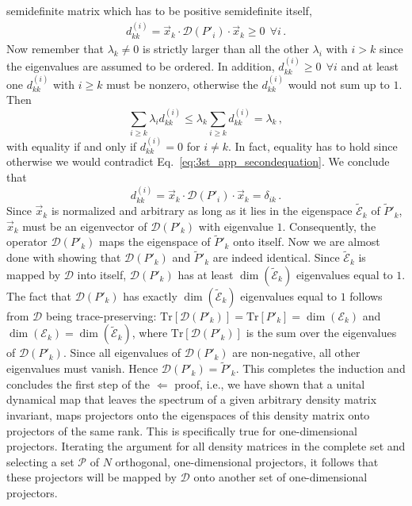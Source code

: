 semidefinite matrix which has to be positive semidefinite
itself,
\begin{eqnarray*}
d_{kk}^{\left(i\right)}=\vec{x}_{k}\cdot\mathcal{D}\left(P'_{i}\right)
\cdot\vec{x}_{k} \geq  0\ ~\forall i \,.
\end{eqnarray*}
Now remember that $\lambda_{k}\neq0$ is strictly larger than
all the other $\lambda_{i}$ with $i>k$  since the eigenvalues are assumed
to be ordered. In addition, $d_{kk}^{\left(i\right)}\geq0\ ~\forall i$
and at least one $d_{kk}^{\left(i\right)}$ with $i\ge k$ must be nonzero,
otherwise the $d_{kk}^{\left(i\right)}$ would not sum up to $1$. Then
\begin{equation*}
\sum_{i\geq k}\lambda_{i}d_{kk}^{\left(i\right)}
\leq \lambda_{k}\sum_{i\geq k}d_{kk}^{\left(i\right)}
=\lambda_{k} \,,
\end{equation*}
with equality if and only if $d_{kk}^{\left(i\right)}=0$ for $i\neq
k$. In fact, equality has to hold since otherwise we would contradict
Eq.~\eqref{eq:3st_app_secondequation}. We conclude that
\begin{equation*}
d_{kk}^{\left(i\right)}
=\vec{x}_{k}\cdot\mathcal{D}\left(P'_{i}\right)\cdot\vec{x}_{k}=\delta_{ik} \,.
\end{equation*}
Since $\vec{x}_{k}$ is normalized and arbitrary as long
as it lies in the eigenspace $\tilde{\mathcal E}_{k}$
of $\tilde{P}'_{k}$,
$\vec{x}_{k}$ must be an eigenvector of $\mathcal{D}\left(P'_{k}\right)$
with eigenvalue $1$. Consequently, the operator
$\mathcal{D}\left(P'_{k}\right)$ maps the eigenspace of
$\tilde{P}'_{k}$ onto itself. Now we are almost done
with showing that $\mathcal{D}\left(P'_{k}\right)$ and $\tilde{P}'_{k}$ are indeed
identical. Since $\tilde{\mathcal E}_{k}$ is mapped by
$\mathcal D$ into itself,
$\mathcal{D}\left(P'_{k}\right)$ has at least $\dim(\tilde{\mathcal E}_{k})$
eigenvalues equal to $1$. The fact that
$\mathcal{D}\left(P'_{k}\right)$ has exactly $\dim(\tilde{\mathcal E}_{k})$
eigenvalues equal to $1$ follows from $\mathcal{D}$ being
trace-preserving:
$\text{Tr}\left[\mathcal{D}\left(P'_{k}\right)\right]
=\text{Tr}\left[P'_{k}\right]=\dim (\mathcal E_{k})$
and $\dim (\mathcal E_{k})=\dim(\tilde{\mathcal E}_{k})$,
where $\text{Tr}\left[\mathcal{D}\left(P'_{k}\right)\right]$
is the sum over the eigenvalues of $\mathcal{D}\left(P'_{k}\right)$.
Since all eigenvalues of $\mathcal{D}\left(P'_{k}\right)$
are non-negative, all other eigenvalues must vanish.
Hence $\mathcal{D}\left(P'_{k}\right)=\tilde{P}'_{k}$.
This completes the induction and concludes the first step of the
$\Longleftarrow$ proof, i.e., we have shown that a unital dynamical
map that leaves the spectrum of a given arbitrary density matrix
invariant, maps projectors onto the eigenspaces of this density
matrix onto projectors of the same rank. This is specifically true
for one-dimensional projectors.
Iterating the argument for all density matrices in the complete set
and selecting a set $\mathcal{P}$ of $N$ orthogonal, one-dimensional
projectors,  it follows that these projectors will be mapped by
$\mathcal{D}$ onto another set of one-dimensional projectors.

